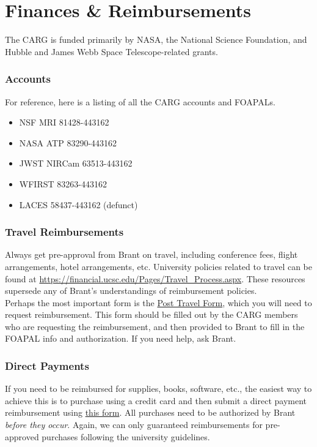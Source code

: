 \section{Finances \& Reimbursements}
\label{sec:finances}

The CARG is funded primarily by
NASA,
the National Science Foundation,
and Hubble and James Webb Space
Telescope-related grants. 

\subsubsection{Accounts}
For reference, here is a listing of all the CARG accounts and FOAPALs.
\begin{itemize}
\item NSF MRI 81428-443162
\item NASA ATP 83290-443162
\item JWST NIRCam 63513-443162
\item WFIRST 83263-443162
\item LACES 58437-443162 (defunct)
\end{itemize}

\subsubsection{Travel Reimbursements}

Always get pre-approval from 
Brant on travel,
including conference fees,
flight arrangements, 
hotel arrangements, etc. 
University policies related to
travel can be found at \href{https://financial.ucsc.edu/Pages/Travel_Process.aspx}{https://financial.ucsc.edu/Pages/Travel\_Process.aspx}. These resources
supersede any of Brant's 
understandings of reimbursement
policies.\\

\noindent
Perhaps the most important form is the 
\href{https://financial.ucsc.edu/Financial_Affairs_Forms/Post_Travel_Expense.pdf}{Post Travel Form}, which
you will need to request reimbursement.
This form should be filled out by
the CARG members who are 
requesting the reimbursement, and
then provided to Brant to fill in
the FOAPAL info and authorization.
If you need help, ask Brant.

\subsubsection{Direct Payments}
\label{sec:direct_payments}

If you need to be reimbursed for supplies, books, software, etc., the easiest way to achieve this is to purchase using a credit card and then submit a direct payment reimbursement using \href{https://financial.ucsc.edu/Pages/WF_Direct_Payment.aspx}{this form}. All purchases need to be authorized by Brant \emph{before they occur}. Again, we can only guaranteed reimbursements for pre-approved purchases following the university guidelines.


